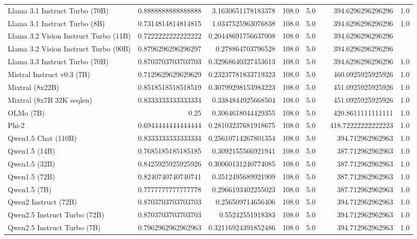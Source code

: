 \begin{table}[htp]
{\begin{tabular}{lrrrrrrr}
Llama 3.1 Instruct Turbo (70B) & 0.8888888888888888 & 3.1630651178183378 & 108.0 & 5.0 &  & 394.6296296296296 & 1.0 \\
Llama 3.1 Instruct Turbo (8B) & 0.7314814814814815 & 1.0347525963076838 & 108.0 & 5.0 &  & 394.6296296296296 & 1.0 \\
Llama 3.2 Vision Instruct Turbo (11B) & 0.7222222222222222 & 0.20448691756637008 & 108.0 & 5.0 &  & 394.6296296296296 &  \\
Llama 3.2 Vision Instruct Turbo (90B) & 0.8796296296296297 & 0.278864703796528 & 108.0 & 5.0 &  & 394.6296296296296 &  \\
Llama 3.3 Instruct Turbo (70B) & 0.8703703703703703 & 0.32968640327453613 & 108.0 & 5.0 &  & 394.6296296296296 & 1.0 \\
Mistral Instruct v0.3 (7B) & 0.7129629629629629 & 0.23237781833719323 & 108.0 & 5.0 &  & 460.0925925925926 & 1.0 \\
Mixtral (8x22B) & 0.8518518518518519 & 0.30799298153983223 & 108.0 & 5.0 &  & 451.0925925925926 & 1.0 \\
Mixtral (8x7B 32K seqlen) & 0.8333333333333334 & 0.3384844925668504 & 108.0 & 5.0 &  & 451.0925925925926 & 1.0 \\
OLMo (7B) & 0.25 & 0.3064618044429355 & 108.0 & 5.0 &  & 420.8611111111111 & 1.0 \\
Phi-2 & 0.6944444444444444 & 0.28103237681918675 & 108.0 & 5.0 &  & 418.72222222222223 & 1.0 \\
Qwen1.5 Chat (110B) & 0.8333333333333334 & 0.25610714267801354 & 108.0 & 5.0 &  & 394.712962962963 & 1.0 \\
Qwen1.5 (14B) & 0.7685185185185185 & 0.3092155566921941 & 108.0 & 5.0 &  & 387.712962962963 & 1.0 \\
Qwen1.5 (32B) & 0.8425925925925926 & 0.30060131240774085 & 108.0 & 5.0 &  & 387.712962962963 & 1.0 \\
Qwen1.5 (72B) & 0.8240740740740741 & 0.3512495689921909 & 108.0 & 5.0 &  & 387.712962962963 & 1.0 \\
Qwen1.5 (7B) & 0.7777777777777778 & 0.2966193402255023 & 108.0 & 5.0 &  & 387.712962962963 & 1.0 \\
Qwen2 Instruct (72B) & 0.8703703703703703 & 0.256509714656406 & 108.0 & 5.0 &  & 394.712962962963 & 1.0 \\
Qwen2.5 Instruct Turbo (72B) & 0.8703703703703703 & 0.55242551918383 & 108.0 & 5.0 &  & 394.712962962963 & 1.0 \\
Qwen2.5 Instruct Turbo (7B) & 0.7962962962962963 & 0.32116924391852486 & 108.0 & 5.0 &  & 394.712962962963 & 1.0 \\

\end{tabular}}
\end{table}
